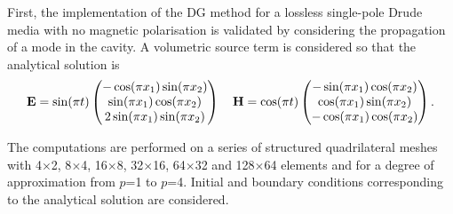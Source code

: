 First, the implementation of the DG method for a lossless single-pole Drude media with no magnetic polarisation is validated by considering the propagation of a mode in the cavity. A volumetric source term is considered so that the analytical solution is
% 
\begin{equation*}
\E = \sin (\pi t) 
\begin{pmatrix}
- \cos (\pi x_1) \sin (\pi x_2) \\
  \sin (\pi x_1) \cos (\pi x_2) \\
2 \sin (\pi x_1) \sin (\pi x_2) 
\end{pmatrix}
%
\quad
%
\H = \cos (\pi t) 
\begin{pmatrix}
- \sin (\pi x_1) \cos (\pi x_2) \\
  \cos (\pi x_1) \sin (\pi x_2) \\
- \cos (\pi x_1) \cos (\pi x_2) 
\end{pmatrix}.
\end{equation*}

The computations are performed on a series of structured quadrilateral meshes with 4$\times$2, 8$\times$4, 16$\times$8, 32$\times$16,  64$\times$32 and 128$\times$64 elements and for a degree of approximation from $p$=1 to $p$=4. Initial and boundary conditions corresponding to the analytical solution are considered.

